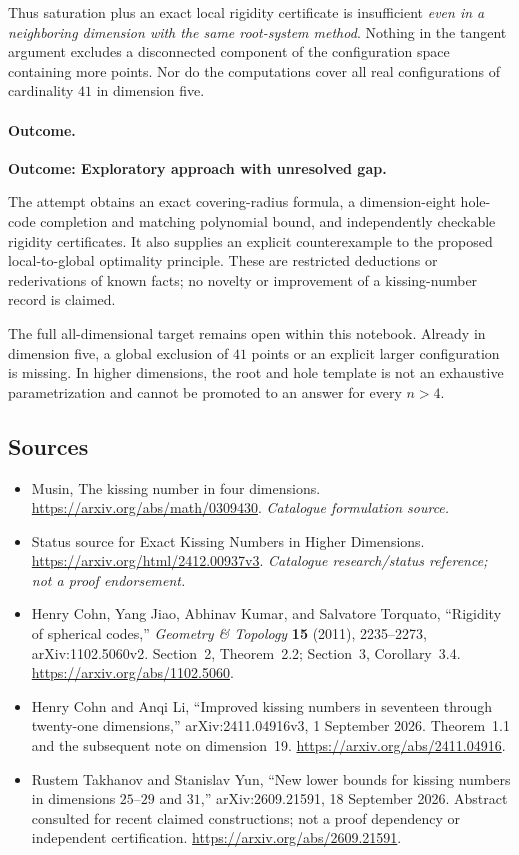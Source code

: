 \documentclass[11pt,a4paper]{article}
\numberwithin{equation}{section}
\begin{document}
Thus saturation plus an exact local rigidity certificate is insufficient
\emph{even in a neighboring dimension with the same root-system method}.
Nothing in the tangent argument excludes a disconnected component of the
configuration space containing more points. Nor do the computations
cover all real configurations of cardinality $41$ in dimension five.

\paragraph{Outcome.}
\textbf{Outcome: Exploratory approach with unresolved gap.}

The attempt obtains an exact covering-radius formula, a dimension-eight
hole-code completion and matching polynomial bound, and independently
checkable rigidity certificates. It also supplies an explicit
counterexample to the proposed local-to-global optimality principle.
These are restricted deductions or rederivations of known facts; no
novelty or improvement of a kissing-number record is claimed.

The full all-dimensional target remains open within this notebook.
Already in dimension five, a global exclusion of $41$ points or an
explicit larger configuration is missing. In higher dimensions, the root
and hole template is not an exhaustive parametrization and cannot be
promoted to an answer for every $n>4$.
\subsection{Sources}
\begin{itemize}\raggedright
\item[\textnormal{[S1]}]\hypertarget{source:1369:1}{} Musin, The kissing number in four dimensions.
\url{https://arxiv.org/abs/math/0309430}.
{\small\textit{Catalogue formulation source.}}
\item[\textnormal{[S2]}]\hypertarget{source:1369:2}{} Status source for Exact Kissing Numbers in Higher Dimensions.
\url{https://arxiv.org/html/2412.00937v3}.
{\small\textit{Catalogue research/status reference; not a proof endorsement.}}
\item[\textnormal{[E1]}]\hypertarget{extra:1369:1}{}
Henry Cohn, Yang Jiao, Abhinav Kumar, and Salvatore Torquato,
``Rigidity of spherical codes,'' \emph{Geometry \& Topology}
\textbf{15} (2011), 2235--2273, arXiv:1102.5060v2.
Section~2, Theorem~2.2; Section~3, Corollary~3.4.
\url{https://arxiv.org/abs/1102.5060}.
\item[\textnormal{[E2]}]\hypertarget{extra:1369:2}{}
Henry Cohn and Anqi Li, ``Improved kissing numbers in seventeen through
twenty-one dimensions,'' arXiv:2411.04916v3, 1 September 2026.
Theorem~1.1 and the subsequent note on dimension~19.
\url{https://arxiv.org/abs/2411.04916}.
\item[\textnormal{[E3]}]\hypertarget{extra:1369:3}{}
Rustem Takhanov and Stanislav Yun, ``New lower bounds for kissing numbers
in dimensions $25$--$29$ and $31$,'' arXiv:2609.21591,
18 September 2026. Abstract consulted for recent claimed constructions;
not a proof dependency or independent certification.
\url{https://arxiv.org/abs/2609.21591}.
\end{itemize}
\end{document}
